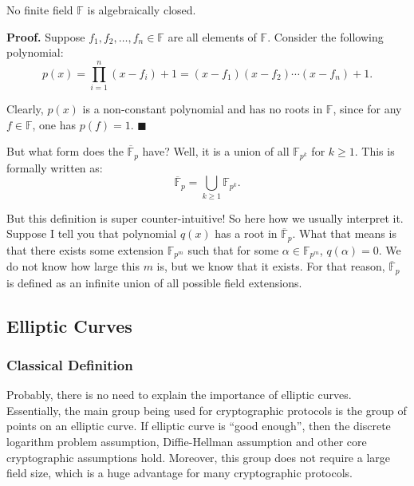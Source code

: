 \documentclass[../lecture-notes.tex]{subfiles}
\begin{document}
\begin{theorem}
    No finite field $\mathbb{F}$ is algebraically closed.
\end{theorem}

\textbf{Proof.} Suppose $f_1,f_2,\dots,f_n \in \mathbb{F}$ are all elements of $\mathbb{F}$. Consider the following polynomial:
\begin{equation}
    p(x) = \prod_{i=1}^n (x-f_i)+1 = (x-f_1)(x-f_2)\cdots(x-f_n)+1.
\end{equation}

Clearly, $p(x)$ is a non-constant polynomial and has no roots in $\mathbb{F}$, since for any $f \in \mathbb{F}$, one has $p(f)=1$. $\blacksquare$

But what form does the $\overline{\mathbb{F}}_{p}$ have? Well, it is a union of all $\mathbb{F}_{p^k}$ for $k \geq 1$. This is formally written as:
\begin{equation}
    \overline{\mathbb{F}}_{p} = \bigcup_{k \geq 1} \mathbb{F}_{p^k}.
\end{equation} 

\begin{remark}
    But this definition is super counter-intuitive! So here how we usually interpret it. Suppose I tell you that polynomial $q(x)$ has a root in $\overline{\mathbb{F}}_p$. What that means is that there exists some extension $\mathbb{F}_{p^m}$ such that for some $\alpha \in \mathbb{F}_{p^m}$, $q(\alpha)=0$. We do not know how large this $m$ is, but we know that it exists. For that reason, $\overline{\mathbb{F}}_p$ is defined as an infinite union of all possible field extensions.
\end{remark}

\subsection{Elliptic Curves}

\subsubsection{Classical Definition}

Probably, there is no need to explain the importance of elliptic curves. Essentially, the main group being used for cryptographic 
protocols is the group of points on an elliptic curve. If elliptic curve is ``good enough'', then the discrete logarithm problem assumption,
Diffie-Hellman assumption and other core cryptographic assumptions hold. Moreover, this group does not require
a large field size, which is a huge advantage for many cryptographic protocols.
\end{document}
